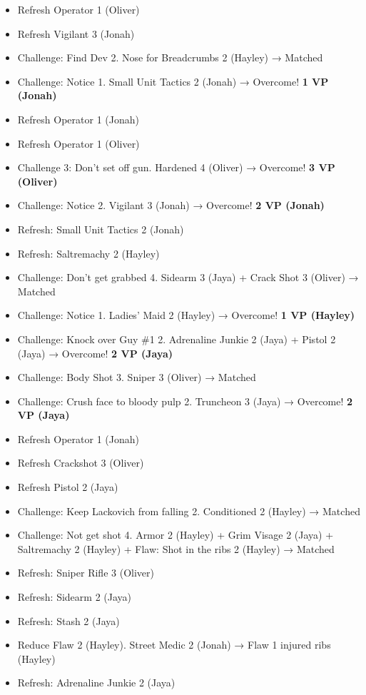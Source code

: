\begin{itemize}
\item Refresh Operator 1 (Oliver)
\item Refresh Vigilant 3 (Jonah)
\item Challenge: Find Dev 2. Nose for Breadcrumbs 2 (Hayley) → Matched
\item Challenge: Notice 1.  Small Unit Tactics 2 (Jonah) → Overcome! \textbf{1 VP (Jonah)}
\item Refresh Operator 1 (Jonah)
\item Refresh Operator 1 (Oliver)
\item Challenge 3: Don't set off gun.  Hardened 4 (Oliver) → Overcome! \textbf{3 VP (Oliver)}
\item Challenge: Notice 2.  Vigilant 3 (Jonah)  → Overcome! \textbf{2 VP (Jonah)}
\item Refresh: Small Unit Tactics 2 (Jonah)
\item Refresh: Saltremachy 2 (Hayley)
\item Challenge: Don't get grabbed 4.  Sidearm 3 (Jaya) + Crack Shot 3 (Oliver) → Matched
\item Challenge: Notice 1.  Ladies' Maid 2 (Hayley) → Overcome! \textbf{1 VP (Hayley)}
\item Challenge: Knock over Guy \#1 2.  Adrenaline Junkie 2 (Jaya) + Pistol 2 (Jaya)  → Overcome! \textbf{2 VP (Jaya)}
\item Challenge: Body Shot 3.  Sniper 3 (Oliver) → Matched
\item Challenge: Crush face to bloody pulp 2.  Truncheon 3 (Jaya)  → Overcome! \textbf{2 VP (Jaya)}
\item Refresh Operator 1 (Jonah)
\item Refresh Crackshot 3 (Oliver)
\item Refresh Pistol 2 (Jaya)
\item Challenge: Keep Lackovich from falling 2.  Conditioned 2 (Hayley) → Matched
\item Challenge: Not get shot 4.  Armor 2 (Hayley) + Grim Visage 2 (Jaya) + Saltremachy 2 (Hayley) + Flaw: Shot in the ribs 2 (Hayley) → Matched
\item Refresh: Sniper Rifle 3 (Oliver)
\item Refresh: Sidearm 2 (Jaya)
\item Refresh: Stash 2 (Jaya)
\item Reduce Flaw 2 (Hayley).  Street Medic 2 (Jonah) →  {\color[RGB]{255,0,0}Flaw 1 injured ribs (Hayley)} 
\item Refresh: Adrenaline Junkie 2 (Jaya)

\end{itemize}
